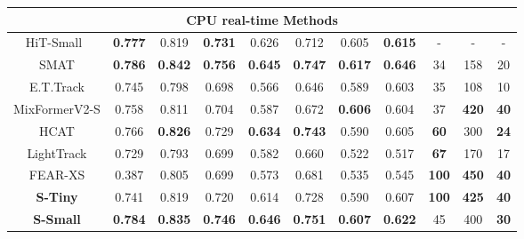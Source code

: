 \begin{table}[th!]
{\begin{tabular}{c |c c  c |c c |c c |c c c}
	\hline
	\multicolumn{11}{c}{CPU real-time Methods} \\
	\hline  
	
	HiT-Small~\cite{kang2023exploring} & \color{ForestGreen} \bf{0.777} & 0.819 & \color{ForestGreen} \bf{0.731} & 0.626 & 0.712 & 0.605 & \color{ForestGreen} \bf{0.615} & - & - & -\\
	SMAT \cite{gopal2024separable} &  \color{Mahogany} \bf{0.786} &  \color{Mahogany} \bf{0.842}  &  \color{Mahogany} \bf{0.756} &  \color{RoyalBlue} \bf{0.645}  &  \color{RoyalBlue} \bf{0.747} &  \color{Mahogany} \bf{0.617}  &  \color{Mahogany} \bf{0.646}  & 34 & 158 & 20 \\
	E.T.Track \cite{blatter2023efficient} & 0.745  & 0.798  & 0.698 & 0.566  & 0.646 & 0.589  & 0.603 & 35 & 108 & 10 \\
	MixFormerV2-S \cite{cui2024mixformerv2} & 0.758  & 0.811  & 0.704 & 0.587  & 0.672 & \color{ForestGreen} \bf{0.606}  & 0.604  & 37 & \color{ForestGreen} \bf{420} & \color{Mahogany} \bf{40} \\
	HCAT \cite{chen2022efficient} & 0.766  & \color{ForestGreen} \bf{0.826}  & 0.729 & \color{ForestGreen} \bf{0.634}  & \color{ForestGreen} \bf{0.743} & 0.590  & 0.605 & \color{ForestGreen} \bf{60} & 300 & \color{ForestGreen} \bf{24} \\
	LightTrack \cite{yan2021lighttrack} & 0.729  & 0.793  & 0.699 & 0.582  & 0.660  & 0.522  & 0.517 & \color{RoyalBlue} \bf{67} & 170 & 17 \\
	FEAR-XS \cite{borsuk2022fear} & 0.387 & 0.805 & 0.699 & 0.573  & 0.681  & 0.535  & 0.545 &  \color{Mahogany} \bf{100} & \color{Mahogany} \bf{450} & \color{Mahogany} \bf{40}\\
  
	
	\rowcolor{lightgray!20} \bf{S-Tiny}  & 0.741  & 0.819  & 0.720 & 0.614  & 0.728 & 0.590  &  0.607  &  \color{Mahogany} \bf{100} & \color{RoyalBlue} \bf{425} & \color{Mahogany} \bf{40}\\
	\rowcolor{lightgray!20} \bf{S-Small} & \color{RoyalBlue} \bf{0.784}  & \color{RoyalBlue} \bf{0.835}  & \color{RoyalBlue} \bf{0.746} & \color{Mahogany} \bf{0.646}  &  \color{Mahogany} \bf{0.751}  & \color{RoyalBlue} \bf{0.607}  & \color{RoyalBlue} \bf{0.622}  &  45 & 400 & \color{RoyalBlue} \bf{30}\\
	\hline
	\end{tabular}
	}
  \end{table}



